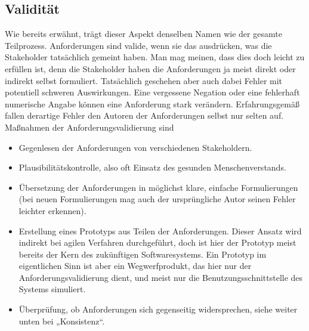 \subsection{Validität}
\label{sec:Kap-6.4.1}

Wie bereits erwähnt, trägt dieser Aspekt denselben Namen wie der gesamte Teilprozess. Anforderungen sind valide, wenn sie das ausdrücken, was die Stakeholder tatsächlich gemeint haben. Man mag meinen, dass dies doch leicht zu erfüllen ist, denn die Stakeholder haben die Anforderungen ja meist direkt oder indirekt selbst formuliert. Tatsächlich geschehen aber auch dabei Fehler mit potentiell schweren Auswirkungen. Eine vergessene Negation oder eine fehlerhaft numerische Angabe können eine Anforderung stark verändern. Erfahrungsgemäß fallen derartige Fehler den Autoren der Anforderungen selbst nur selten auf. Maßnahmen der Anforderungsvalidierung sind 

\begin{itemize}
\item Gegenlesen der Anforderungen von verschiedenen Stakeholdern.
\item Plausibilitätskontrolle, also oft Einsatz des gesunden Menschenverstands.
\item Übersetzung der Anforderungen in möglichst klare, einfache Formulierungen (bei neuen Formulierungen mag auch der ursprüngliche Autor seinen Fehler leichter erkennen).

\pagebreak %

\item Erstellung eines Prototyps aus Teilen der Anforderungen. Dieser Ansatz wird indirekt bei agilen Verfahren durchgeführt, doch ist hier der Prototyp meist bereits der Kern des zukünftigen Softwaresystems. Ein Prototyp im eigentlichen Sinn ist aber ein Wegwerfprodukt, das hier nur der Anforderungsvalidierung dient, und meist nur die Benutzungsschnittstelle des Systems simuliert.
\item Überprüfung, ob Anforderungen sich gegenseitig widersprechen, siehe weiter unten bei „Konsistenz“.
\end{itemize}